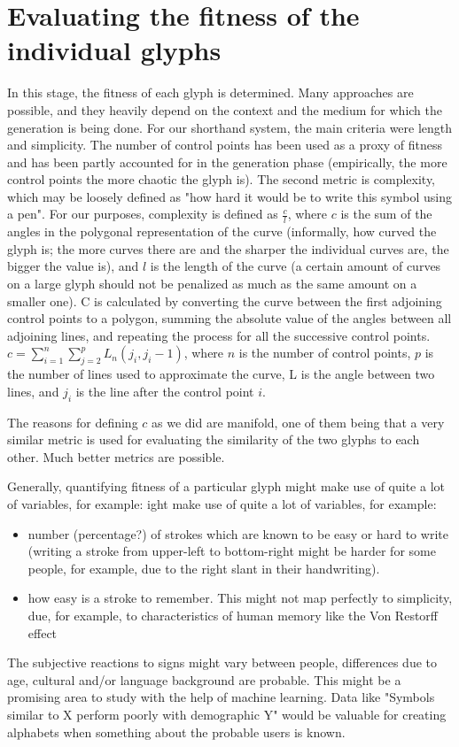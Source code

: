 \documentclass[conference]{IEEEtran}
\begin{document}
\balance

\section{Evaluating the fitness of the individual glyphs}
In this stage, the fitness of each glyph is determined. Many approaches are possible, and they heavily depend on the context and the medium for which the generation is being done. For our shorthand system, the main criteria were length and simplicity. The number of control points has been used as a proxy of fitness and has been partly accounted for in the generation phase (empirically, the more control points the more chaotic the glyph is). The second metric is complexity, which may be loosely
defined as "how hard it would be to write this symbol using a pen". For our purposes, complexity is defined as \(\frac{c}{l}\), where \(c\) is the sum of the angles in the polygonal representation of the curve (informally, how curved the glyph is; the more curves there are and the sharper the individual curves are, the bigger the value is), and \(l\) is the length of the curve (a certain amount of curves on a large glyph should not be penalized as much as the same amount on a smaller one). C is calculated by converting the curve between the first adjoining control points to a polygon, summing the absolute value of the angles between all adjoining lines, and repeating the process for all the successive control points.
\(c=\sum_{i=1}^n\sum_{j=2}^{p}L_n(j_i, j_i-1)\), where \(n\) is the number of control points,  \(p\) is the number of lines used to approximate the curve, L is the angle between two lines,  and \(j_i\) is the line after the control point \(i\). 

The reasons for defining \(c\) as we did are manifold, one of them being that a very similar metric is used for evaluating the similarity of the two glyphs to each other. Much better metrics are possible.

Generally, quantifying fitness of a particular glyph might make use of quite a lot of variables, for example:
ight make use of quite a lot of variables, for example:
\begin{itemize}
        \item number (percentage?) of strokes which are known to be easy or hard to write (writing a stroke from upper-left to bottom-right might be harder for some people, for example, due to the right slant in their handwriting). 
        \item how easy is a stroke to remember. This might not map perfectly to simplicity, due, for example, to characteristics of human memory like the Von Restorff effect~\cite{hunt1995subtlety}
\end{itemize}
	The subjective reactions to signs might vary between people, differences due to age, cultural and/or language background are probable. This might be a promising area to study with the help of machine learning. Data like "Symbols similar to X perform poorly with demographic Y" would be valuable for creating alphabets when something about the probable users is known. 
\end{document}
